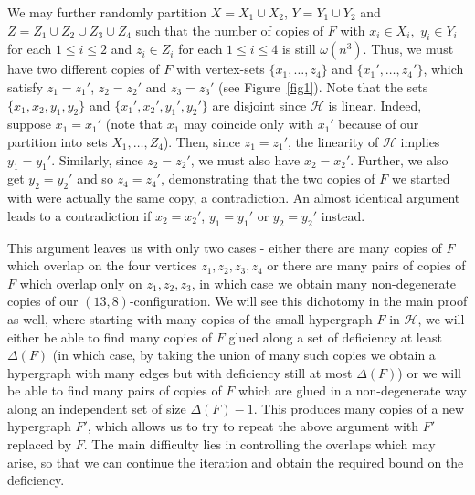 \documentclass{daj}
\def\cH{\mathcal{H}}
\theoremstyle{plain}
\theoremstyle{remark}
\begin{document}
We may further randomly partition $X=X_1\cup X_2$, $Y=Y_1\cup Y_2$ and $Z=Z_1\cup Z_2\cup Z_3\cup Z_4$ such that the number of copies of $F$ with $x_i\in X_i,$ $y_i \in Y_i$ for each $1 \le i \le 2$ and $z_i\in Z_i$ for each $1 \le i \le 4$ is still $\omega(n^3)$. Thus, we must have two different copies of $F$ with vertex-sets $\{x_1, \dots, z_4\}$ and $\{x_1', \dots, z_4'\}$, which satisfy $z_1=z_1'$, $z_2=z_2'$ and $z_3=z_3'$ (see Figure~\ref{fig1}). Note that the sets $\{x_1, x_2, y_1, y_2\}$ and $\{x_1', x_2', y_1', y_2'\}$ are disjoint since $\cH$ is linear. Indeed, suppose $x_1=x_1'$ (note that $x_1$ may coincide only with $x_1'$ because of our partition into sets $X_1, \dots, Z_4$).  Then, since $z_1=z_1'$, the linearity of $\cH$ implies $y_1=y_1'$. Similarly, since $z_2=z_2'$, we must also have $x_2=x_2'$. Further, we also get $y_2=y_2'$ and so $z_4=z_4'$, demonstrating that the two copies of $F$ we started with were actually the same copy, a contradiction. An almost identical argument leads to a contradiction if $x_2=x_2'$, $y_1=y_1'$ or $y_2=y_2'$ instead. 

This argument leaves us with only two cases - either there are many copies of $F$ which overlap on the four vertices $z_1, z_2, z_3, z_4$ or there are many pairs of copies of $F$ which overlap only on $z_1, z_2, z_3$, in which case we obtain many non-degenerate copies of our $(13, 8)$-configuration. We will see this dichotomy in the main proof as well, where starting with many copies of the small hypergraph $F$ in $\cH$, we will either be able to find many copies of $F$ glued along a set of deficiency at least $\Delta(F)$ (in which case, by taking the union of many such copies we obtain a hypergraph with many edges but with deficiency still at most $\Delta(F)$) or we will be able to find many pairs of copies of $F$ which are glued in a non-degenerate way along an independent set of size $\Delta(F)-1$. This produces many copies of a new hypergraph $F'$, which allows us to try to repeat the above argument with $F'$ replaced by $F$. The main difficulty lies in controlling the overlaps which may arise, so that we can continue the iteration and obtain the required bound on the deficiency. 
\end{document}
